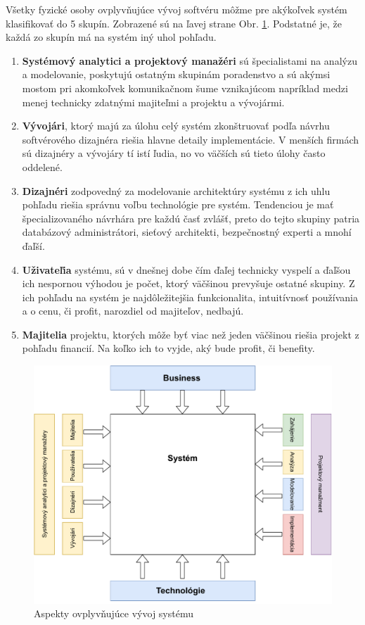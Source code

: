 Všetky fyzické osoby ovplyvňujúce vývoj softvéru môžme pre akýkoľvek systém klasifikovať do 5 skupín. Zobrazené sú na ľavej strane Obr. \ref{fig:system-inputs}. Podstatné je, že každá zo skupín má na systém iný uhol pohľadu.

\begin{enumerate}
	\item \textbf{Systémový analytici a projektový manažéri} sú špecialistami na analýzu a modelovanie, poskytujú ostatným skupinám poradenstvo a sú akýmsi mostom pri akomkoľvek komunikačnom šume vznikajúcom napríklad medzi menej technicky zdatnými majiteľmi a projektu a vývojármi.
	\item \textbf{Vývojári}, ktorý majú za úlohu celý systém zkonštruovať podľa návrhu softvérového dizajnéra riešia hlavne detaily implementácie. V menších firmách sú dizajnéry a vývojáry tí istí ľudia, no vo väčších sú tieto úlohy často oddelené.
	\item \textbf{Dizajnéri} zodpovedný za modelovanie architektúry systému z ich uhlu pohľadu riešia správnu voľbu technológie pre systém. Tendenciou je mať špecializovaného návrhára pre každú časť zvlášť, preto do tejto skupiny patria databázový administrátori, sieťový architekti, bezpečnostný experti a mnohí ďaľší.
	\item \textbf{Uživateľia} systému, sú v dnešnej dobe čím ďaľej technicky vyspelí a ďaľšou ich nespornou výhodou je počet, ktorý väčšinou prevyšuje ostatné skupiny. Z ich pohľadu na systém je najdôležitejšia funkcionalita, intuitívnosť používania a o cenu, či profit, narozdiel od majiteľov, nedbajú.
	\item \textbf{Majitelia} projektu, ktorých môže byť viac než jeden väčšinou riešia projekt z pohľadu financií. Na koľko ich to vyjde, aký bude profit, či benefity.
\end{enumerate}
\begin{figure}[H]
	\centering
	\includegraphics[scale=0.75]{obrazky-figures/TR-system-inputs}
	\caption{Aspekty ovplyvňujúce vývoj systému \cite{whitten2007systems}}
	\label{fig:system-inputs}
\end{figure}

